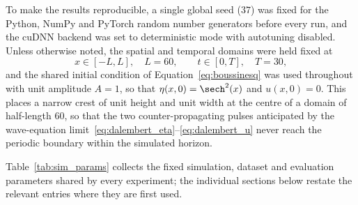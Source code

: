 To make the results reproducible, a single global seed ($37$) was fixed for the Python, NumPy and PyTorch random number generators before every run, and the cuDNN backend was set to deterministic mode with autotuning disabled. Unless otherwise noted, the spatial and temporal domains were held fixed at
\begin{equation}\label{eq:domain}
    x \in [-L, L], \quad L = 60, \qquad t \in [0, T], \quad T = 30,
\end{equation}
and the shared initial condition of Equation~\eqref{eq:boussinesq} was used throughout with unit amplitude $A = 1$, so that $\eta(x,0) = \sech^2(x)$ and $u(x,0) = 0$. This places a narrow crest of unit height and unit width at the centre of a domain of half-length $60$, so that the two counter-propagating pulses anticipated by the wave-equation limit~\eqref{eq:dalembert_eta}--\eqref{eq:dalembert_u} never reach the periodic boundary within the simulated horizon.

Table~\ref{tab:sim_params} collects the fixed simulation, dataset and evaluation parameters shared by every experiment; the individual sections below restate the relevant entries where they are first used.

